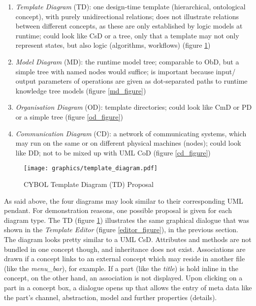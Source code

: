 \begin{enumerate}
    \item \emph{Template Diagram} (TD): one design-time template (hierarchical,
        ontological concept), with purely unidirectional relations; does not
        illustrate relations between different concepts, as these are only
        established by logic models at runtime; could look like CsD or a tree,
        only that a template may not only represent states, but also logic
        (algorithms, workflows) (figure \ref{td_figure})
    \item \emph{Model Diagram} (MD): the runtime model tree; comparable to ObD,
        but a simple tree with named nodes would suffice; is important because
        input/ output parameters of operations are given as dot-separated paths
        to runtime knowledge tree models (figure \ref{md_figure})
    \item \emph{Organisation Diagram} (OD): template directories; could look
        like CmD or PD or a simple tree (figure \ref{od_figure})
    \item \emph{Communication Diagram} (CD): a network of communicating
        systems, which may run on the same or on different physical machines
        (nodes); could look like DD; not to be mixed up with UML CoD (figure
        \ref{cd_figure})
\end{enumerate}

\begin{figure}[ht]
    \begin{center}
        \texttt{[image: graphics/template\_diagram.pdf]}
        \caption{CYBOL Template Diagram (TD) Proposal}
        \label{td_figure}
    \end{center}
\end{figure}

As said above, the four diagrams may look similar to their corresponding UML
pendant. For demonstration reasons, one possible proposal is given for each
diagram type. The TD (figure \ref{td_figure}) illustrates the same graphical
dialogue that was shown in the \emph{Template Editor} (figure
\ref{editor_figure}), in the previous section. The diagram looks pretty similar
to a UML CsD. Attributes and methods are not bundled in one concept though, and
inheritance does not exist. Associations are drawn if a concept links to an
external concept which may reside in another file (like the \emph{menu\_bar}),
for example. If a part (like the \emph{title}) is hold inline in the concept,
on the other hand, an association is not displayed. Upon clicking on a part in
a concept box, a dialogue opens up that allows the entry of meta data like the
part's channel, abstraction, model and further properties (details).

